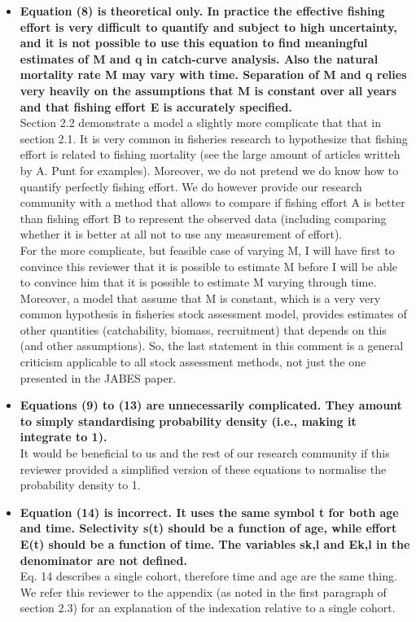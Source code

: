 \documentclass[11pt]{article}
\begin{document}
\begin{spacing}{1.2}
\begin{itemize}
\item {\bf Equation (8) is theoretical only.  In practice the effective fishing effort is very difficult to quantify and subject to high uncertainty, and it is not possible to use this equation to find meaningful estimates of M and q in catch-curve analysis.  Also the natural mortality rate M may vary with time.  Separation of M and q relies very heavily on the assumptions that M is constant over all years and that fishing effort E is accurately specified.} \\
Section 2.2 demonstrate a model a slightly more complicate that that in section 2.1. It is very common in fisheries research to hypothesize that fishing effort is related to fishing mortality (see the large amount of articles writteh by A. Punt for examples). Moreover, we do not pretend we do know how to quantify perfectly fishing effort. We do however provide our research community with a method that allows to compare if fishing effort A is better than fishing effort B to represent the observed data (including comparing whether it is better at all not to use any measurement of effort). \\
For the more complicate, but feasible case of varying M, I will have first to convince this reviewer that it is possible to estimate M before I will be able to convince him that it is possible to estimate M varying through time. \\

Moreover, a model that assume that M is constant, which is a very very common hypothesis in fisheries stock assessment model, provides estimates of other quantities (catchability, biomass, recruitment) that depends on this (and other assumptions). So, the last statement in this comment is a general criticism applicable to all stock assessment methods, not just the one presented in the JABES paper.\\

\item {\bf Equations (9) to (13) are unnecessarily complicated.  They amount to simply standardising probability density (i.e., making it integrate to 1).} \\
It would be beneficial to us and the rest of our research community if this reviewer provided a simplified version of these equations to normalise the probability density to 1.\\

\item {\bf Equation (14) is incorrect.  It uses the same symbol t for both age and time.  Selectivity s(t) should be a function of age, while effort E(t) should be a function of time.  The variables sk,l and Ek,l in the denominator are not defined.} \\
Eq. 14 describes a single cohort, therefore time and age are the same thing. We refer this reviewer to the appendix (as noted in the first paragraph of section 2.3) for an explanation of the indexation relative to a single cohort.\\


\end{itemize}
\end{spacing}
\end{document}
